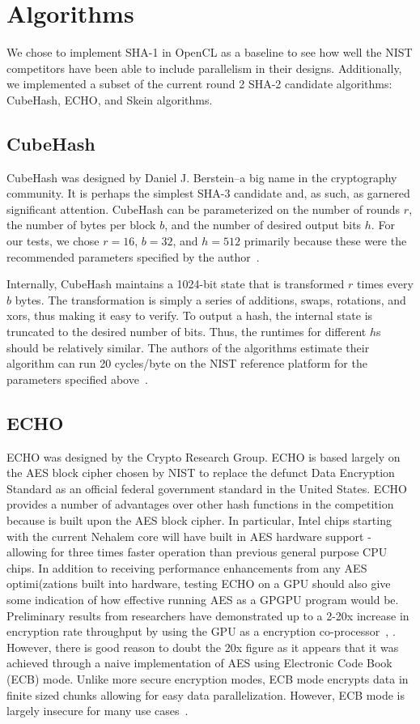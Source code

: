
\section*{Algorithms}
We chose to implement SHA-1 in OpenCL as a baseline to see how well the NIST competitors have been able to include parallelism in their designs.
Additionally, we implemented a subset of the current round 2 SHA-2 candidate algorithms: CubeHash, ECHO, and Skein algorithms.

\subsection*{CubeHash}

CubeHash was designed by Daniel J. Berstein--a big name in the cryptography community.
It is perhaps the simplest SHA-3 candidate and, as such, as garnered significant attention.
CubeHash can be parameterized on the number of rounds $r$, the number of bytes per block $b$, and the number of desired output bits $h$.
For our tests, we chose $r=16$, $b=32$, and $h=512$ primarily because these were the recommended parameters specified by the author~\cite{CubeHash-spec}.

Internally, CubeHash maintains a 1024-bit state that is transformed $r$ times every $b$ bytes.
The transformation is simply a series of additions, swaps, rotations, and xors, thus making it easy to verify.
To output a hash, the internal state is truncated to the desired number of bits.
Thus, the runtimes for different $h$s should be relatively similar.
The authors of the algorithms estimate their algorithm can run 20 cycles/byte on the NIST reference platform for the parameters specified above~\cite{Bernstein}.

\subsection*{ECHO}
ECHO was designed by the Crypto Research Group.
ECHO is based largely on the AES block cipher chosen by NIST to replace the defunct Data Encryption Standard as an official federal government standard in the United States.
ECHO provides a number of advantages over other hash functions in the competition because is built upon the AES block cipher.
In particular, Intel chips starting with the current Nehalem core will have built in AES hardware support - allowing for three times faster operation than previous general purpose CPU chips.\cite{Westmere}
In addition to receiving performance enhancements from any AES optimi(zations built into hardware, testing ECHO on a GPU should also give some indication of how effective running AES as a GPGPU program would be.
Preliminary results from researchers have demonstrated up to a 2-20x increase in encryption rate throughput by using the GPU as a encryption co-processor~\cite{Harrison}, \cite{Manavski}.
However, there is good reason to doubt the 20x figure as it appears that it was achieved through a naive implementation of AES using Electronic Code Book (ECB) mode.
Unlike more secure encryption modes, ECB mode encrypts data in finite sized chunks allowing for easy data parallelization.  
However, ECB mode is largely insecure for many use cases~\cite{CodeBook}.

